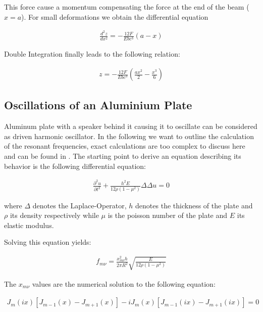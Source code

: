 This force cause a momentum compensating the force at the end of the beam ( $x=a$). For small deformations we obtain the differential equation

\begin{align}
\frac{d^2z}{dx^2}=-\frac{12F}{Ebc^3}(a-x)
\end{align}

Double Integration finally leads to the following relation:

\begin{align}
z=-\frac{12F}{Ebc^3}\left(\frac{ax^2}{2}-\frac{x^3}{6} \right)
\end{align}


\subsection{Oscillations of an Aluminium Plate}

Aluminum plate with a speaker behind it causing it to oscillate can be considered as driven harmonic oscillator. In the following we want to outline the calculation of the resonant frequencies, exact calculations are too complex to discuss here and can be found in \cite{staats}.
The starting point to derive an equation describing its behavior is the following differential equation:

\begin{align}
\frac{\partial^2 u}{\partial t^2}+\frac{h^2E}{12\rho(1-\mu^2)}\Delta\Delta u=0
\end{align}

where $\Delta$ denotes the Laplace-Operator, $h$ denotes the thickness of the plate and $\rho$ its density respectively while $\mu$ is the poisson number of the plate and $E$ its elastic modulus.

Solving this equation yields:

\begin{align}
f_{m\nu}=\frac{x_{m\nu}^2h}{2\pi R^2}\sqrt{\frac{E}{12\rho(1-\mu^2)}} \label{resfreq}
\end{align}

The $x_{m\nu}$ values are the numerical solution to the following equation:

\begin{align}
J_m(ix)\left[ J_{m-1}(x) - J_{m+1}(x)  \right]  - iJ_m(x)\left[ J_{m-1}(ix) - J_{m+1}(ix)  \right] = 0
\end{align}

